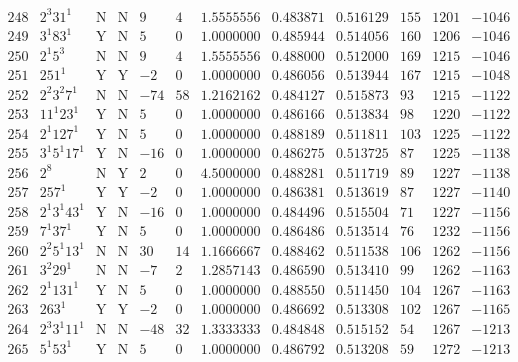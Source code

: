 \documentclass[11pt,reqno,a4letter]{article}
\numberwithin{figure}{section}
\numberwithin{table}{section}
\theoremstyle{plain}
\numberwithin{theorem}{section}
\theoremstyle{definition}
\begin{document}
\begin{table}[h!]
\begin{equation*}
{\begin{array}{cc|cc|ccc|cc|ccc}
 248 & 2^3 31^1 & \text{N} & \text{N} & 9 & 4 & 1.5555556 & 0.483871 & 0.516129 & 155 & 1201 & -1046 \\
 249 & 3^1 83^1 & \text{Y} & \text{N} & 5 & 0 & 1.0000000 & 0.485944 & 0.514056 & 160 & 1206 & -1046 \\
 250 & 2^1 5^3 & \text{N} & \text{N} & 9 & 4 & 1.5555556 & 0.488000 & 0.512000 & 169 & 1215 & -1046 \\
 251 & 251^1 & \text{Y} & \text{Y} & -2 & 0 & 1.0000000 & 0.486056 & 0.513944 & 167 & 1215 & -1048 \\
 252 & 2^2 3^2 7^1 & \text{N} & \text{N} & -74 & 58 & 1.2162162 & 0.484127 & 0.515873 & 93 & 1215 & -1122 \\
 253 & 11^1 23^1 & \text{Y} & \text{N} & 5 & 0 & 1.0000000 & 0.486166 & 0.513834 & 98 & 1220 & -1122 \\
 254 & 2^1 127^1 & \text{Y} & \text{N} & 5 & 0 & 1.0000000 & 0.488189 & 0.511811 & 103 & 1225 & -1122 \\
 255 & 3^1 5^1 17^1 & \text{Y} & \text{N} & -16 & 0 & 1.0000000 & 0.486275 & 0.513725 & 87 & 1225 & -1138 \\
 256 & 2^8 & \text{N} & \text{Y} & 2 & 0 & 4.5000000 & 0.488281 & 0.511719 & 89 & 1227 & -1138 \\
 257 & 257^1 & \text{Y} & \text{Y} & -2 & 0 & 1.0000000 & 0.486381 & 0.513619 & 87 & 1227 & -1140 \\
 258 & 2^1 3^1 43^1 & \text{Y} & \text{N} & -16 & 0 & 1.0000000 & 0.484496 & 0.515504 & 71 & 1227 & -1156 \\
 259 & 7^1 37^1 & \text{Y} & \text{N} & 5 & 0 & 1.0000000 & 0.486486 & 0.513514 & 76 & 1232 & -1156 \\
 260 & 2^2 5^1 13^1 & \text{N} & \text{N} & 30 & 14 & 1.1666667 & 0.488462 & 0.511538 & 106 & 1262 & -1156 \\
 261 & 3^2 29^1 & \text{N} & \text{N} & -7 & 2 & 1.2857143 & 0.486590 & 0.513410 & 99 & 1262 & -1163 \\
 262 & 2^1 131^1 & \text{Y} & \text{N} & 5 & 0 & 1.0000000 & 0.488550 & 0.511450 & 104 & 1267 & -1163 \\
 263 & 263^1 & \text{Y} & \text{Y} & -2 & 0 & 1.0000000 & 0.486692 & 0.513308 & 102 & 1267 & -1165 \\
 264 & 2^3 3^1 11^1 & \text{N} & \text{N} & -48 & 32 & 1.3333333 & 0.484848 & 0.515152 & 54 & 1267 & -1213 \\
 265 & 5^1 53^1 & \text{Y} & \text{N} & 5 & 0 & 1.0000000 & 0.486792 & 0.513208 & 59 & 1272 & -1213 \\

\end{array}}
\end{equation*}
\end{table}
\end{document}
